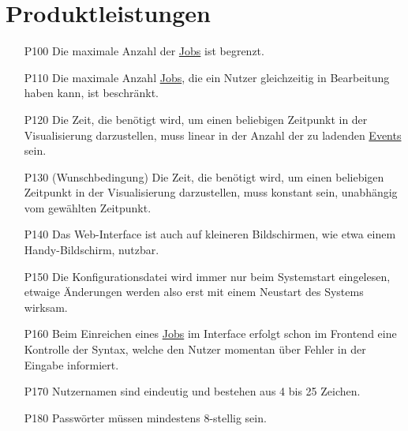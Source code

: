\section{Produktleistungen}

%

\begin{itemize}[noitemsep]
    \item[P100] Die maximale Anzahl der \hyperref[B:Jobs]{Jobs} ist begrenzt.
    
    \item[P110] Die maximale Anzahl \hyperref[B:Jobs]{Jobs}, die ein Nutzer gleichzeitig in Bearbeitung haben kann, ist beschränkt.
    
    \item[P120] Die Zeit, die benötigt wird, um einen beliebigen Zeitpunkt in der Visualisierung darzustellen, muss linear in der Anzahl der zu ladenden \hyperref[B:Event]{Events} sein.
    
    \item[P130] (Wunschbedingung)  Die Zeit, die benötigt wird, um einen beliebigen Zeitpunkt in der Visualisierung darzustellen, muss konstant sein, unabhängig vom gewählten Zeitpunkt.
    
    \item[P140] Das \gls{Web-Interface} ist auch auf kleineren Bildschirmen, wie etwa einem Handy-Bildschirm, nutzbar.
    
    \item[P150] Die \gls{Konfigurationsdatei} wird immer nur beim Systemstart eingelesen, etwaige Änderungen werden also erst mit einem Neustart des Systems wirksam.
    
    \item[P160] Beim Einreichen eines \hyperref[B:Jobs]{Jobs} im Interface erfolgt schon im Frontend eine Kontrolle der Syntax, welche den Nutzer momentan über Fehler in der Eingabe informiert.
    
    \item[P170] Nutzernamen sind eindeutig und bestehen aus 4 bis 25 Zeichen.

    \item[P180] Passwörter müssen mindestens 8-stellig sein.
    

\end{itemize}
